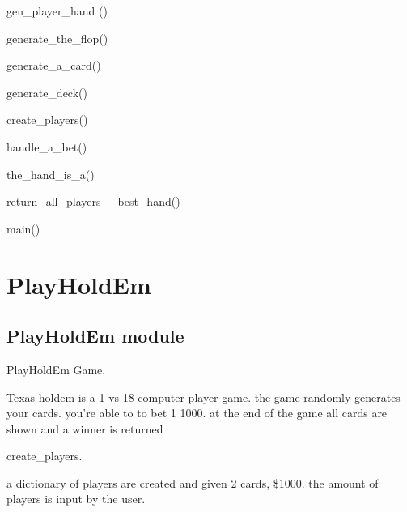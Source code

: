 \documentclass[letterpaper,10pt,english]{sphinxmanual}
\begin{document}
\sphinxAtStartPar
gen\_player\_hand ()

\sphinxAtStartPar
generate\_the\_flop()

\sphinxAtStartPar
generate\_a\_card()

\sphinxAtStartPar
generate\_deck()

\sphinxAtStartPar
create\_players()

\sphinxAtStartPar
handle\_a\_bet()

\sphinxAtStartPar
the\_hand\_is\_a()

\sphinxAtStartPar
return\_all\_players\_\_best\_hand()

\sphinxAtStartPar
main()


\chapter{PlayHoldEm}
\label{\detokenize{modules:playholdem}}\label{\detokenize{modules::doc}}

\section{PlayHoldEm module}
\label{\detokenize{PlayHoldEm:module-PlayHoldEm}}\label{\detokenize{PlayHoldEm:playholdem-module}}\label{\detokenize{PlayHoldEm::doc}}
\sphinxAtStartPar
PlayHoldEm Game.

\sphinxAtStartPar
Texas holdem is a 1 vs 1\sphinxhyphen{}8 computer player game.
the game randomly generates your cards. you’re able to to bet
1 \sphinxhyphen{} 1000. at the end of the game all cards are shown and a winner
is returned

\begin{fulllineitems}
\label{\detokenize{PlayHoldEm:PlayHoldEm.create_players}}
\sphinxAtStartPar
create\_players.

\sphinxAtStartPar
a dictionary of players are created and given 2 cards,
\$1000. the amount of players is input by the user.

\end{fulllineitems}

\end{document}
